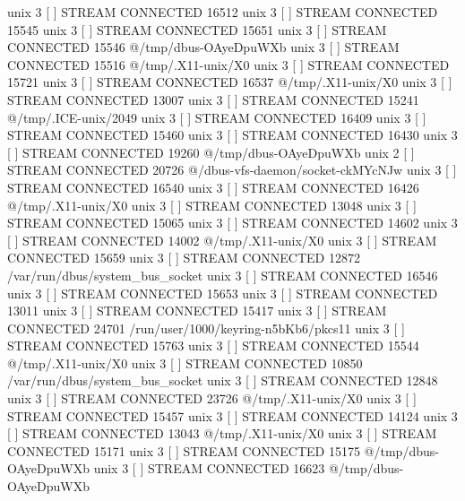 unix  3      [ ]         STREAM     CONNECTED     16512    
unix  3      [ ]         STREAM     CONNECTED     15545    
unix  3      [ ]         STREAM     CONNECTED     15651    
unix  3      [ ]         STREAM     CONNECTED     15546    @/tmp/dbus-OAyeDpuWXb
unix  3      [ ]         STREAM     CONNECTED     15516    @/tmp/.X11-unix/X0
unix  3      [ ]         STREAM     CONNECTED     15721    
unix  3      [ ]         STREAM     CONNECTED     16537    @/tmp/.X11-unix/X0
unix  3      [ ]         STREAM     CONNECTED     13007    
unix  3      [ ]         STREAM     CONNECTED     15241    @/tmp/.ICE-unix/2049
unix  3      [ ]         STREAM     CONNECTED     16409    
unix  3      [ ]         STREAM     CONNECTED     15460    
unix  3      [ ]         STREAM     CONNECTED     16430    
unix  3      [ ]         STREAM     CONNECTED     19260    @/tmp/dbus-OAyeDpuWXb
unix  2      [ ]         STREAM     CONNECTED     20726    @/dbus-vfs-daemon/socket-ckMYcNJw
unix  3      [ ]         STREAM     CONNECTED     16540    
unix  3      [ ]         STREAM     CONNECTED     16426    @/tmp/.X11-unix/X0
unix  3      [ ]         STREAM     CONNECTED     13048    
unix  3      [ ]         STREAM     CONNECTED     15065    
unix  3      [ ]         STREAM     CONNECTED     14602    
unix  3      [ ]         STREAM     CONNECTED     14002    @/tmp/.X11-unix/X0
unix  3      [ ]         STREAM     CONNECTED     15659    
unix  3      [ ]         STREAM     CONNECTED     12872    /var/run/dbus/system_bus_socket
unix  3      [ ]         STREAM     CONNECTED     16546    
unix  3      [ ]         STREAM     CONNECTED     15653    
unix  3      [ ]         STREAM     CONNECTED     13011    
unix  3      [ ]         STREAM     CONNECTED     15417    
unix  3      [ ]         STREAM     CONNECTED     24701    /run/user/1000/keyring-n5bKb6/pkcs11
unix  3      [ ]         STREAM     CONNECTED     15763    
unix  3      [ ]         STREAM     CONNECTED     15544    @/tmp/.X11-unix/X0
unix  3      [ ]         STREAM     CONNECTED     10850    /var/run/dbus/system_bus_socket
unix  3      [ ]         STREAM     CONNECTED     12848    
unix  3      [ ]         STREAM     CONNECTED     23726    @/tmp/.X11-unix/X0
unix  3      [ ]         STREAM     CONNECTED     15457    
unix  3      [ ]         STREAM     CONNECTED     14124    
unix  3      [ ]         STREAM     CONNECTED     13043    @/tmp/.X11-unix/X0
unix  3      [ ]         STREAM     CONNECTED     15171    
unix  3      [ ]         STREAM     CONNECTED     15175    @/tmp/dbus-OAyeDpuWXb
unix  3      [ ]         STREAM     CONNECTED     16623    @/tmp/dbus-OAyeDpuWXb
